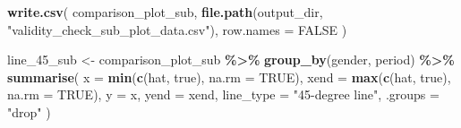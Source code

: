 \documentclass[
]{article}
\newenvironment{Shaded}{\begin{snugshade}}{\end{snugshade}}
\newcommand{\AttributeTok}[1]{\textcolor[rgb]{0.13,0.29,0.53}{#1}}
\newcommand{\ConstantTok}[1]{\textcolor[rgb]{0.56,0.35,0.01}{#1}}
\newcommand{\FunctionTok}[1]{\textcolor[rgb]{0.13,0.29,0.53}{\textbf{#1}}}
\newcommand{\NormalTok}[1]{#1}
\newcommand{\OtherTok}[1]{\textcolor[rgb]{0.56,0.35,0.01}{#1}}
\newcommand{\SpecialCharTok}[1]{\textcolor[rgb]{0.81,0.36,0.00}{\textbf{#1}}}
\newcommand{\StringTok}[1]{\textcolor[rgb]{0.31,0.60,0.02}{#1}}
\begin{document}
\begin{Shaded}
\begin{Highlighting}[]
\FunctionTok{write.csv}\NormalTok{(}
\NormalTok{    comparison\_plot\_sub,}
    \FunctionTok{file.path}\NormalTok{(output\_dir, }\StringTok{"validity\_check\_sub\_plot\_data.csv"}\NormalTok{),}
    \AttributeTok{row.names =} \ConstantTok{FALSE}
\NormalTok{)}

\NormalTok{line\_45\_sub }\OtherTok{\textless{}{-}}\NormalTok{ comparison\_plot\_sub }\SpecialCharTok{\%\textgreater{}\%}
    \FunctionTok{group\_by}\NormalTok{(gender, period) }\SpecialCharTok{\%\textgreater{}\%}
    \FunctionTok{summarise}\NormalTok{(}
        \AttributeTok{x =} \FunctionTok{min}\NormalTok{(}\FunctionTok{c}\NormalTok{(hat, true), }\AttributeTok{na.rm =} \ConstantTok{TRUE}\NormalTok{),}
        \AttributeTok{xend =} \FunctionTok{max}\NormalTok{(}\FunctionTok{c}\NormalTok{(hat, true), }\AttributeTok{na.rm =} \ConstantTok{TRUE}\NormalTok{),}
        \AttributeTok{y =}\NormalTok{ x,}
        \AttributeTok{yend =}\NormalTok{ xend,}
        \AttributeTok{line\_type =} \StringTok{"45{-}degree line"}\NormalTok{,}
        \AttributeTok{.groups =} \StringTok{"drop"}
\NormalTok{    )}


\end{Highlighting}
\end{Shaded}
\end{document}
